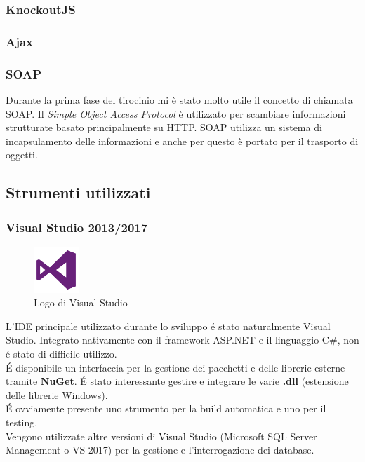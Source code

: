 \subsubsection{KnockoutJS}

\subsubsection{Ajax}

\subsubsection{SOAP}
Durante la prima fase del tirocinio mi è stato molto utile il concetto di chiamata SOAP. Il \textit{Simple Object Access Protocol} è utilizzato per scambiare informazioni strutturate basato principalmente su HTTP. SOAP utilizza un sistema di incapsulamento delle informazioni e anche per questo è portato per il trasporto di oggetti.

\subsection{Strumenti utilizzati}

\subsubsection{Visual Studio 2013/2017}
\begin{figure}
    \begin{center}
        \includegraphics[width=0.15\textwidth]{./res/img/visual-studio-2013-logo.png}
        \caption{Logo di Visual Studio}
    \end{center}
\end{figure}

L'IDE principale utilizzato durante lo sviluppo é stato naturalmente Visual Studio. Integrato nativamente con il framework ASP.NET e il linguaggio C\#, non é stato di difficile utilizzo. \\ É disponibile un interfaccia per la gestione dei pacchetti e delle librerie esterne tramite \textbf{NuGet}. É stato interessante gestire e integrare le varie \textbf{.dll} (estensione delle librerie Windows). \\ É ovviamente presente uno strumento per la build automatica e uno per il testing. \\
Vengono utilizzate altre versioni di Visual Studio (Microsoft SQL Server Management o VS 2017) per la gestione e l'interrogazione dei database.

